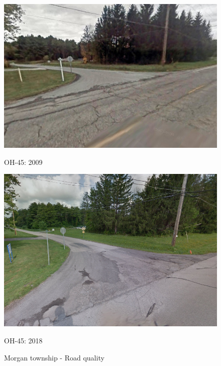 \begin{figure}[htbp]
    \centering
    \begin{minipage}{0.49\textwidth}
        \centering
        \includegraphics[width=\textwidth,keepaspectratio]{images/morgan_township_2801OH-45_2009.png}
        \caption*{OH-45: 2009}
        \label{fig:morgan_oh_2009}
    \end{minipage}
    \hfill
    \begin{minipage}{0.49\textwidth}
        \centering
        \includegraphics[width=\textwidth,keepaspectratio]{images/morgan_township_2801OH-45_2018.png}
        \caption*{OH-45: 2018}
        \label{fig:morgan_oh_2018}
    \end{minipage}
    \caption{Morgan township - Road quality}
    \label{fig:rd_morgan}
\end{figure}


